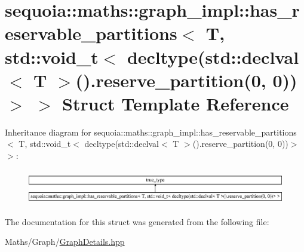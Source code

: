 \hypertarget{structsequoia_1_1maths_1_1graph__impl_1_1has__reservable__partitions_3_01_t_00_01std_1_1void__t_4a79d9591d14cc2b6bc8ba090ba73c62}{}\section{sequoia\+::maths\+::graph\+\_\+impl\+::has\+\_\+reservable\+\_\+partitions$<$ T, std\+::void\+\_\+t$<$ decltype(std\+::declval$<$ T $>$().reserve\+\_\+partition(0, 0))$>$ $>$ Struct Template Reference}
\label{structsequoia_1_1maths_1_1graph__impl_1_1has__reservable__partitions_3_01_t_00_01std_1_1void__t_4a79d9591d14cc2b6bc8ba090ba73c62}
Inheritance diagram for sequoia\+::maths\+::graph\+\_\+impl\+::has\+\_\+reservable\+\_\+partitions$<$ T, std\+::void\+\_\+t$<$ decltype(std\+::declval$<$ T $>$().reserve\+\_\+partition(0, 0))$>$ $>$\+:\begin{figure}[H]
\begin{center}
\leavevmode
\includegraphics[height=1.544828cm]{structsequoia_1_1maths_1_1graph__impl_1_1has__reservable__partitions_3_01_t_00_01std_1_1void__t_4a79d9591d14cc2b6bc8ba090ba73c62}
\end{center}
\end{figure}


The documentation for this struct was generated from the following file\+:\begin{DoxyCompactItemize}
\item 
Maths/\+Graph/\mbox{\hyperlink{_graph_details_8hpp}{Graph\+Details.\+hpp}}\end{DoxyCompactItemize}
